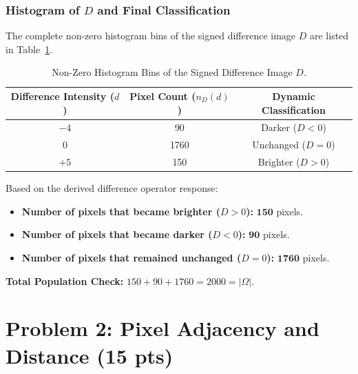 \documentclass[11pt,a4paper]{article}
\begin{document}
\subsubsection{Histogram of $D$ and Final Classification}
The complete non-zero histogram bins of the signed difference image $D$ are listed in Table~\ref{tab:p1_diff_hist}.

\begin{table}[htbp]
\centering
\caption{Non-Zero Histogram Bins of the Signed Difference Image $D$.}
\label{tab:p1_diff_hist}
\begin{tabular}{ccc}
\toprule
\textbf{Difference Intensity ($d$)} & \textbf{Pixel Count ($n_D(d)$)} & \textbf{Dynamic Classification} \\
\midrule
$-4$ & 90   & Darker ($D < 0$) \\
$0$  & 1760 & Unchanged ($D = 0$) \\
$+5$ & 150  & Brighter ($D > 0$) \\
\bottomrule
\end{tabular}
\end{table}

\noindent Based on the derived difference operator response:
\begin{itemize}
    \item \textbf{Number of pixels that became brighter ($D > 0$):} $\mathbf{150}$ pixels.
    \item \textbf{Number of pixels that became darker ($D < 0$):} $\mathbf{90}$ pixels.
    \item \textbf{Number of pixels that remained unchanged ($D = 0$):} $\mathbf{1760}$ pixels.
\end{itemize}
\noindent\textbf{Total Population Check:} $150 + 90 + 1760 = 2000 = |\Omega|$.

\section{Problem 2: Pixel Adjacency and Distance (15 pts)}
\end{document}
